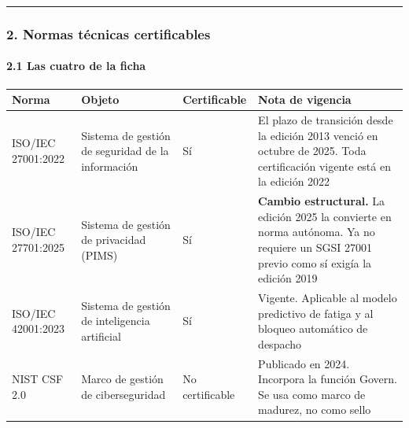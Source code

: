\begin{center}\rule{0.5\linewidth}{0.5pt}\end{center}

\subsubsection{2. Normas técnicas certificables}\label{normas-tuxe9cnicas-certificables}

\paragraph{2.1 Las cuatro de la ficha}\label{las-cuatro-de-la-ficha}

{\def\LTcaptype{none} %
\begin{longtable}[]{@{}
  >{\raggedright\arraybackslash}p{}
  >{\raggedright\arraybackslash}p{}
  >{\centering\arraybackslash}p{}
  >{\raggedright\arraybackslash}p{}@{}}
\toprule\noalign{}
\begin{minipage}[b]{\linewidth}\raggedright
Norma
\end{minipage} & \begin{minipage}[b]{\linewidth}\raggedright
Objeto
\end{minipage} & \begin{minipage}[b]{\linewidth}\centering
Certificable
\end{minipage} & \begin{minipage}[b]{\linewidth}\raggedright
Nota de vigencia
\end{minipage} \\
\midrule\noalign{}
\endhead
\bottomrule\noalign{}
\endlastfoot
ISO/IEC 27001:2022 & Sistema de gestión de seguridad de la información & Sí & El plazo de transición desde la edición 2013 venció en octubre de 2025. Toda certificación vigente está en la edición 2022 \\
ISO/IEC 27701:2025 & Sistema de gestión de privacidad (PIMS) & Sí & \textbf{Cambio estructural.} La edición 2025 la convierte en norma autónoma. Ya no requiere un SGSI 27001 previo como sí exigía la edición 2019 \\
ISO/IEC 42001:2023 & Sistema de gestión de inteligencia artificial & Sí & Vigente. Aplicable al modelo predictivo de fatiga y al bloqueo automático de despacho \\
NIST CSF 2.0 & Marco de gestión de ciberseguridad & No certificable & Publicado en 2024. Incorpora la función Govern. Se usa como marco de madurez, no como sello \\
\end{longtable}
}

